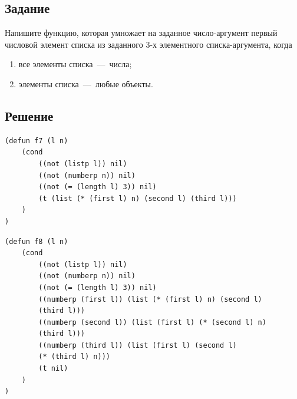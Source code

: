 \subsection*{Задание}
Напишите функцию, которая умножает на заданное число-аргумент первый числовой элемент списка из заданного 3-х элементного списка-аргумента, когда

\begin{enumerate}
	\item все элементы списка~---~числа;
	\item элементы списка~---~любые объекты.
\end{enumerate}

\subsection*{Решение}
\begin{code}
\begin{verbatim}
(defun f7 (l n)
	(cond
		((not (listp l)) nil)
		((not (numberp n)) nil)
		((not (= (length l) 3)) nil)
		(t (list (* (first l) n) (second l) (third l)))
	)
)
\end{verbatim}
\end{code}

\begin{code}
\begin{verbatim}
(defun f8 (l n)
	(cond
		((not (listp l)) nil)
		((not (numberp n)) nil)
		((not (= (length l) 3)) nil)
		((numberp (first l)) (list (* (first l) n) (second l) 
		(third l)))
		((numberp (second l)) (list (first l) (* (second l) n) 
		(third l)))
		((numberp (third l)) (list (first l) (second l) 
		(* (third l) n)))
		(t nil)
	)
)
\end{verbatim}
\end{code}

\newpage